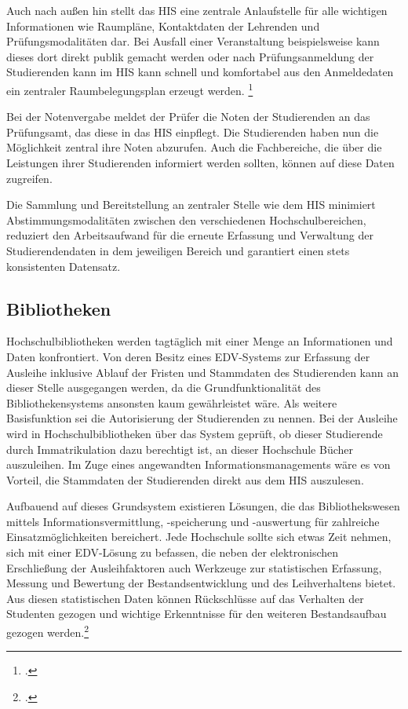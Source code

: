 Auch nach außen hin stellt das HIS eine zentrale Anlaufstelle für alle wichtigen 
Informationen wie Raumpläne, Kontaktdaten der Lehrenden und Prüfungsmodalitäten dar. Bei 
Ausfall einer Veranstaltung beispielsweise kann dieses dort direkt publik gemacht werden oder nach Prüfungsanmeldung der Studierenden kann im HIS kann schnell und komfortabel aus den Anmeldedaten ein zentraler Raumbelegungsplan erzeugt werden.
\footcite{evalag_eckpunkte_2012}

Bei der Notenvergabe meldet der Prüfer die Noten der Studierenden an das Prüfungsamt, das 
diese in das HIS einpflegt. Die Studierenden haben nun die Möglichkeit zentral ihre Noten 
abzurufen. Auch die Fachbereiche, die über die Leistungen ihrer Studierenden informiert 
werden sollten, können auf diese Daten zugreifen.

Die Sammlung und Bereitstellung an zentraler Stelle wie dem HIS minimiert 
Abstimmungsmodalitäten zwischen den verschiedenen Hochschulbereichen, reduziert den 
Arbeitsaufwand für die erneute Erfassung und Verwaltung der Studierendendaten in dem 
jeweiligen Bereich und garantiert einen stets konsistenten Datensatz.


\subsection{Bibliotheken}
Hochschulbibliotheken werden tagtäglich mit einer Menge an Informationen und Daten 
konfrontiert. Von deren Besitz eines EDV-Systems zur Erfassung der Ausleihe inklusive Ablauf 
der Fristen und Stammdaten des Studierenden kann an dieser Stelle ausgegangen werden, da 
die Grundfunktionalität des Bibliothekensystems ansonsten kaum gewährleistet wäre. Als 
weitere Basisfunktion sei die Autorisierung der Studierenden zu nennen. Bei der Ausleihe 
wird in Hochschulbibliotheken über das System geprüft, ob dieser Studierende durch 
Immatrikulation dazu berechtigt ist, an dieser Hochschule Bücher auszuleihen. 
Im Zuge eines angewandten Informationsmanagements wäre es von Vorteil, die Stammdaten der Studierenden direkt aus dem HIS auszulesen. 

Aufbauend auf dieses Grundsystem existieren Lösungen, die das Bibliothekswesen mittels 
Informationsvermittlung, -speicherung und -auswertung für zahlreiche 
Einsatzmöglichkeiten bereichert. Jede Hochschule sollte sich etwas Zeit nehmen, sich mit 
einer EDV-Lösung zu befassen, die neben der elektronischen Erschließung der 
Ausleihfaktoren auch Werkzeuge zur statistischen Erfassung, Messung und Bewertung der 
Bestandsentwicklung und des Leihverhaltens bietet. Aus diesen statistischen Daten können 
Rückschlüsse auf das Verhalten der Studenten gezogen und wichtige Erkenntnisse für den 
weiteren Bestandsaufbau gezogen werden.\footcite[9 ff.]{merkle_aufbau_2004}

